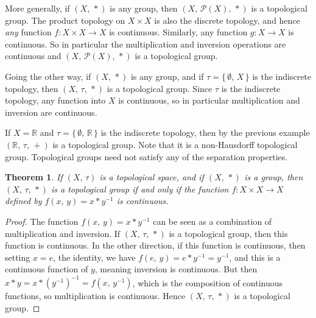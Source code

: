 \documentclass{article}
\theoremstyle{plain}
\newtheorem{theorem}{Theorem}[section]
\theoremstyle{normal}
\newenvironment{example}{%
    \pushQED{\qed}\renewcommand{\qedsymbol}{$\blacksquare$}\examplex%
}{%
    \popQED\endexamplex%
}
\begin{document}
        \begin{example}
            More generally, if $(X,\,*)$ is any group, then
            $(X,\,\mathcal{P}(X),\,*)$ is a topological group. The product
            topology on $X\times{X}$ is also the discrete topology, and hence
            \textit{any} function $f:X\times{X}\rightarrow{X}$ is continuous.
            Similarly, any function $g:X\rightarrow{X}$ is continuous. So
            in particular the multiplication and inversion operations are
            continuous and $(X,\,\mathcal{P}(X),\,*)$ is a topological group.
        \end{example}
        \begin{example}
            Going the other way, if $(X,\,*)$ is any group, and if
            $\tau=\{\,\emptyset,\,X\,\}$ is the indiscrete topology, then
            $(X,\,\tau,\,*)$ is a topological group. Since $\tau$ is the
            indiscrete topology, any function into $X$ is continuous,
            so in particular multiplication and inversion are continuous.
        \end{example}
        \begin{example}
            If $X=\mathbb{R}$ and $\tau=\{\,\emptyset,\,\mathbb{R}\,\}$ is the
            indiscrete topology, then by the previous example
            $(\mathbb{R},\,\tau,\,+)$ is a topological group. Note that it is
            a non-Hausdorff topological group. Topological groups need not
            satisfy any of the separation properties.
        \end{example}
        \begin{theorem}
            If $(X,\,\tau)$ is a topological space, and if $(X,\,*)$ is a
            group, then $(X,\,\tau,\,*)$ is a topological group if and only
            if the function $f:X\times{X}\rightarrow{X}$ defined by
            $f(x,\,y)=x*y^{-1}$ is continuous.
        \end{theorem}
        \begin{proof}
            The function $f(x,\,y)=x*y^{-1}$ can be seen as a
            combination of multiplication and inversion. If $(X,\,\tau,\,*)$ is
            a topological group, then this function is continuous. In the
            other direction, if this function is continuous, then setting
            $x=e$, the identity, we have $f(e,\,y)=e*y^{-1}=y^{-1}$, and this
            is a continuous function of $y$, meaning inversion is continuous.
            But then $x*y=x*(y^{-1})^{-1}=f(x,\,y^{-1})$, which is
            the composition of continuous functions, so multiplication is
            continuous. Hence $(X,\,\tau,\,*)$ is a topological group.
        \end{proof}
\end{document}

